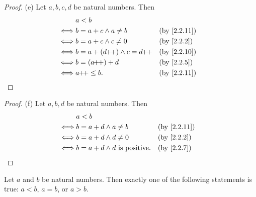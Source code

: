 \begin{proof}{(e)}
  Let \(a, b, c, d\) be natural numbers.
  Then
  \begin{align*}
         & a < b                                                        \\
    \iff & b = a + c \land a \neq b      &  & \text{(by \cref{2.2.11})} \\
    \iff & b = a + c \land c \neq 0      &  & \text{(by \cref{2.2.2})}  \\
    \iff & b = a + (d\pp) \land c = d\pp &  & \text{(by \cref{2.2.10})} \\
    \iff & b = (a\pp) + d                &  & \text{(by \cref{2.2.5})}  \\
    \iff & a\pp \leq b.                  &  & \text{(by \cref{2.2.11})}
  \end{align*}
\end{proof}

\begin{proof}{(f)}
  Let \(a, b, d\) be natural numbers.
  Then
  \begin{align*}
         & a < b                                                                 \\
    \iff & b = a + d \land a \neq b               &  & \text{(by \cref{2.2.11})} \\
    \iff & b = a + d \land d \neq 0               &  & \text{(by \cref{2.2.2})}  \\
    \iff & b = a + d \land d \text{ is positive}. &  & \text{(by \cref{2.2.7})}
  \end{align*}
\end{proof}

\begin{prop}\label{2.2.13}
  Let \(a\) and \(b\) be natural numbers.
  Then exactly one of the following statements is true: \(a < b\), \(a = b\), or \(a > b\).
\end{prop}

